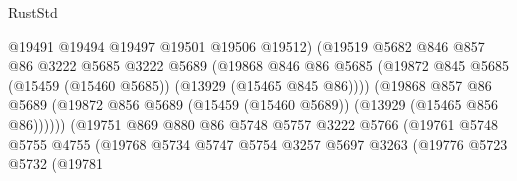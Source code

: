 \begin{lexlean}{RustStd}
\begin{coremodule}
                                      @19491
                                      @19494
                                      @19497
                                      @19501
                                      @19506
                                      @19512)
                                    (@19519
                                      @5682
                                      @846
                                      @857
                                      @86
                                      @3222
                                      @5685
                                      @3222
                                      @5689
                                      (@19868
                                        @846
                                        @86
                                        @5685
                                        (@19872
                                          @845
                                          @5685
                                          (@15459 (@15460 @5685))
                                          (@13929 (@15465 @845 @86))))
                                      (@19868
                                        @857
                                        @86
                                        @5689
                                        (@19872
                                          @856
                                          @5689
                                          (@15459 (@15460 @5689))
                                          (@13929 (@15465 @856 @86))))))
                                  (@19751
                                    @869
                                    @880
                                    @86
                                    @5748
                                    @5757
                                    @3222
                                    @5766
                                    (@19761
                                      @5748
                                      @5755
                                      @4755
                                      (@19768
                                        @5734
                                        @5747
                                        @5754
                                        @3257
                                        @5697
                                        @3263
                                        (@19776
                                          @5723
                                          @5732
                                          (@19781

\end{coremodule}
\end{lexlean}
